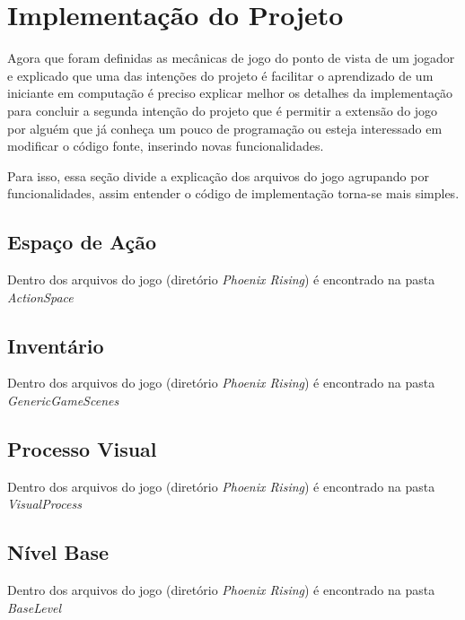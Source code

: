 
\chapter{Implementação do Projeto}
\label{cap:Implementação}

Agora que foram definidas as mecânicas de jogo do ponto de vista de um jogador e
explicado que uma das intenções do projeto é facilitar o aprendizado de um 
iniciante em computação é preciso explicar melhor os detalhes da implementação
para concluir a segunda intenção do projeto que é permitir a extensão do jogo
por alguém que já conheça um pouco de programação ou esteja interessado em 
modificar o código fonte, inserindo novas funcionalidades. 

Para isso, essa seção divide a explicação dos arquivos do jogo agrupando por 
funcionalidades, assim entender o código de implementação torna-se mais simples.

\section{Espaço de Ação}

Dentro dos arquivos do jogo (diretório \textit{Phoenix Rising}) é encontrado na 
pasta \textit{ActionSpace}

\section{Inventário}

Dentro dos arquivos do jogo (diretório \textit{Phoenix Rising}) é encontrado na 
pasta \textit{GenericGameScenes}

\section{Processo Visual}

Dentro dos arquivos do jogo (diretório \textit{Phoenix Rising}) é encontrado na
pasta \textit{VisualProcess}

\section{Nível Base}

Dentro dos arquivos do jogo (diretório \textit{Phoenix Rising}) é encontrado na
pasta \textit{BaseLevel}

